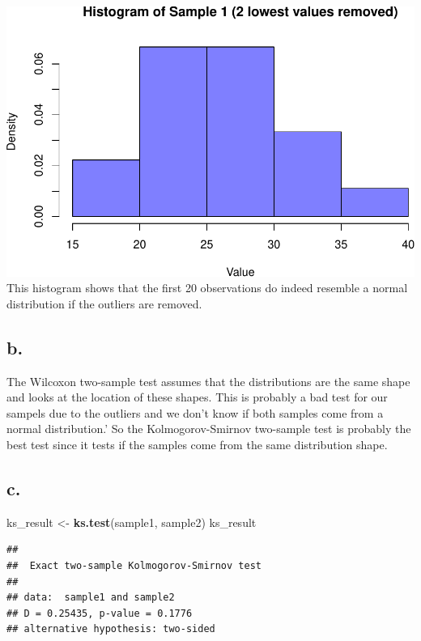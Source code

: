 \documentclass[
]{article}
\newenvironment{Shaded}{\begin{snugshade}}{\end{snugshade}}
\newcommand{\FunctionTok}[1]{\textcolor[rgb]{0.13,0.29,0.53}{\textbf{#1}}}
\newcommand{\NormalTok}[1]{#1}
\newcommand{\OtherTok}[1]{\textcolor[rgb]{0.56,0.35,0.01}{#1}}
\begin{document}
\includegraphics{SDA_submission_template_files/figure-latex/unnamed-chunk-6-1.pdf}
This histogram shows that the first 20 observations do indeed resemble a
normal distribution if the outliers are removed.

\subsection{b.}\label{b.-1}

The Wilcoxon two-sample test assumes that the distributions are the same
shape and looks at the location of these shapes. This is probably a bad
test for our sampels due to the outliers and we don't know if both
samples come from a normal distribution.' So the Kolmogorov-Smirnov
two-sample test is probably the best test since it tests if the samples
come from the same distribution shape.

\subsection{c.}\label{c.-1}

\begin{Shaded}
\begin{Highlighting}[]
\NormalTok{ks\_result }\OtherTok{\textless{}{-}} \FunctionTok{ks.test}\NormalTok{(sample1, sample2)}
\NormalTok{ks\_result}
\end{Highlighting}
\end{Shaded}

\begin{verbatim}
## 
##  Exact two-sample Kolmogorov-Smirnov test
## 
## data:  sample1 and sample2
## D = 0.25435, p-value = 0.1776
## alternative hypothesis: two-sided
\end{verbatim}
\end{document}
